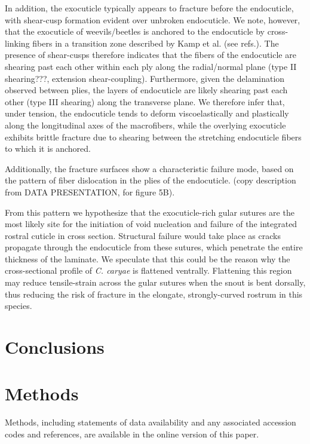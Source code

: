\documentclass[twocolumn, linenumbers, superscriptaddress]{revtex4-1}
\begin{document}
		In addition, the exocuticle typically appears to fracture before the endocuticle, with shear-cusp formation evident over unbroken endocuticle.
		We note, however, that the exocuticle of weevils/beetles is anchored to the endocuticle by cross-linking fibers in a transition zone described by Kamp et al. (see refs.).
		The presence of shear-cusps therefore indicates that the fibers of the endocuticle are shearing past each other within each ply along the radial/normal plane (type II shearing???, extension shear-coupling).
		Furthermore, given the delamination observed between plies, the layers of endocuticle are likely shearing past each other (type III shearing) along the transverse plane.
		We therefore infer that, under tension, the endocuticle tends to deform viscoelastically and plastically along the longitudinal axes of the macrofibers, while the overlying exocuticle exhibits brittle fracture due to shearing between the stretching endocuticle fibers to which it is anchored.
		
		Additionally, the fracture surfaces show a characteristic failure mode, based on the pattern of fiber dislocation in the plies of the endocuticle.
		(copy description from DATA PRESENTATION, for figure 5B).
		
		From this pattern we hypothesize that the exocuticle-rich gular sutures are the most likely site for the initiation of void nucleation and failure of the integrated rostral cuticle in cross section.
		Structural failure would take place as cracks propagate through the endocuticle from these sutures, which penetrate the entire thickness of the laminate.
		We speculate that this could be the reason why the cross-sectional profile of \textit{C. caryae} is flattened ventrally.
		Flattening this region may reduce tensile-strain across the gular sutures when the snout is bent dorsally, thus reducing the risk of fracture in the elongate, strongly-curved rostrum in this species.

	\section{Conclusions}
		

	\section{Methods}
		Methods, including statements of data availability and any associated accession codes and references, are available in the online version of this paper.
	
\end{document}

